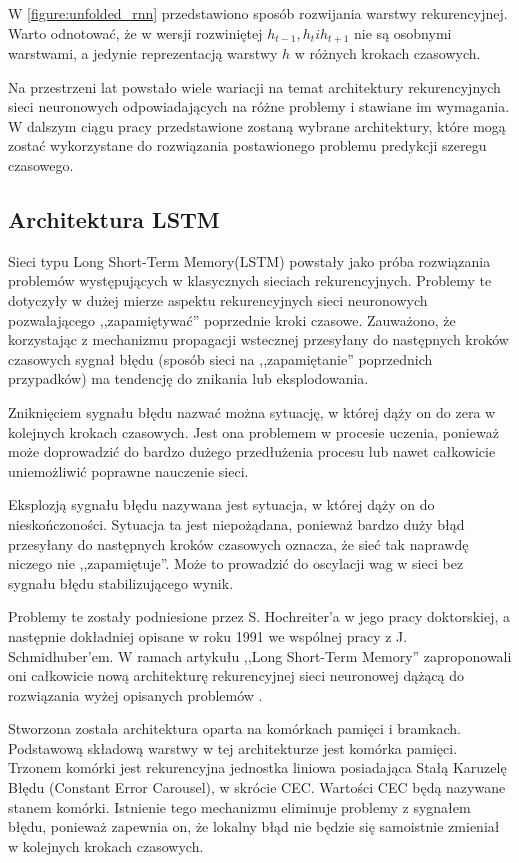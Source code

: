 \documentclass[10pt,a4paper]{article}
\begin{document}
W \autoref{figure:unfolded_rnn} przedstawiono sposób rozwijania warstwy rekurencyjnej. Warto odnotować, że w wersji rozwiniętej $h_{t-1}, h_t i h_{t+1}$ nie są osobnymi warstwami, a jedynie reprezentacją warstwy $h$ w różnych krokach czasowych. 

Na przestrzeni lat powstało wiele wariacji na temat architektury rekurencyjnych sieci neuronowych odpowiadających na różne problemy i stawiane im wymagania. W dalszym ciągu pracy przedstawione zostaną wybrane architektury, które mogą zostać wykorzystane do rozwiązania postawionego problemu predykcji szeregu czasowego.


\subsection{Architektura LSTM}
\label{subsection:introduction:LSTM}
Sieci typu Long Short-Term Memory(LSTM) powstały jako próba rozwiązania problemów występujących w klasycznych sieciach rekurencyjnych. Problemy te dotyczyły w dużej mierze aspektu rekurencyjnych sieci neuronowych pozwalającego ,,zapamiętywać'' poprzednie kroki czasowe. Zauważono, że korzystając z mechanizmu propagacji wstecznej przesyłany do następnych kroków czasowych sygnał błędu (sposób sieci na ,,zapamiętanie'' poprzednich przypadków) ma tendencję do znikania lub eksplodowania. 

Zniknięciem sygnału błędu nazwać można sytuację, w której dąży on do zera w kolejnych krokach czasowych. Jest ona problemem w procesie uczenia, ponieważ może doprowadzić do bardzo dużego przedłużenia procesu lub nawet całkowicie uniemożliwić poprawne nauczenie sieci.

Eksplozją sygnału błędu nazywana jest sytuacja, w której dąży on do nieskończoności. Sytuacja ta jest niepożądana, ponieważ bardzo duży błąd przesyłany do następnych kroków czasowych oznacza, że sieć tak naprawdę niczego nie ,,zapamiętuje''. Może to prowadzić do oscylacji wag w sieci bez sygnału błędu stabilizującego wynik. 

Problemy te zostały podniesione przez S. Hochreiter'a w jego pracy doktorskiej, a następnie dokładniej opisane w roku 1991 we wspólnej pracy z J. Schmidhuber'em. 
W ramach artykułu ,,Long Short-Term Memory'' zaproponowali oni całkowicie nową architekturę rekurencyjnej sieci neuronowej dążącą do rozwiązania wyżej opisanych problemów \cite{hochreiter1997long}.

Stworzona została architektura oparta na komórkach pamięci i bramkach. Podstawową składową warstwy w tej architekturze jest komórka pamięci. Trzonem komórki jest rekurencyjna jednostka liniowa posiadająca Stałą Karuzelę Błędu (Constant Error Carousel), w skrócie CEC. Wartości CEC będą nazywane stanem komórki. Istnienie tego mechanizmu eliminuje problemy z sygnałem błędu, ponieważ zapewnia on, że lokalny błąd nie będzie się samoistnie zmieniał w kolejnych krokach czasowych.
\end{document}
